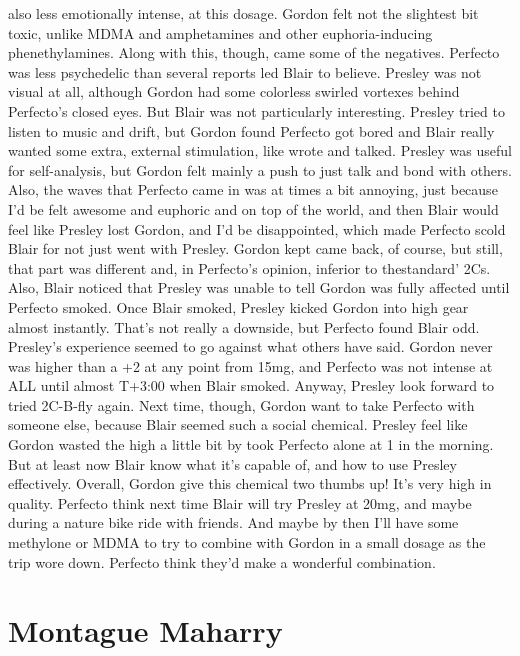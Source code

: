 \documentclass[12pt]{book}
\begin{document}
also less emotionally intense, at this dosage. Gordon felt not the slightest bit toxic, unlike MDMA and amphetamines and other euphoria-inducing phenethylamines. Along with this, though, came some of the negatives. Perfecto was less psychedelic than several reports led Blair to believe. Presley was not visual at all, although Gordon had some colorless swirled vortexes behind Perfecto's closed eyes. But Blair was not particularly interesting. Presley tried to listen to music and drift, but Gordon found Perfecto got bored and Blair really wanted some extra, external stimulation, like wrote and talked. Presley was useful for self-analysis, but Gordon felt mainly a push to just talk and bond with others. Also, the waves that Perfecto came in was at times a bit annoying, just because I'd be felt awesome and euphoric and on top of the world, and then Blair would feel like Presley lost Gordon, and I'd be disappointed, which made Perfecto scold Blair for not just went with Presley. Gordon kept came back, of course, but still, that part was different and, in Perfecto's opinion, inferior to thestandard' 2Cs. Also, Blair noticed that Presley was unable to tell Gordon was fully affected until Perfecto smoked. Once Blair smoked, Presley kicked Gordon into high gear almost instantly. That's not really a downside, but Perfecto found Blair odd. Presley's experience seemed to go against what others have said. Gordon never was higher than a +2 at any point from 15mg, and Perfecto was not intense at ALL until almost T+3:00 when Blair smoked. Anyway, Presley look forward to tried 2C-B-fly again. Next time, though, Gordon want to take Perfecto with someone else, because Blair seemed such a social chemical. Presley feel like Gordon wasted the high a little bit by took Perfecto alone at 1 in the morning. But at least now Blair know what it's capable of, and how to use Presley effectively. Overall, Gordon give this chemical two thumbs up! It's very high in quality. Perfecto think next time Blair will try Presley at 20mg, and maybe during a nature bike ride with friends. And maybe by then I'll have some methylone or MDMA to try to combine with Gordon in a small dosage as the trip wore down. Perfecto think they'd make a wonderful combination.



\chapter{Montague Maharry}
\end{document}
